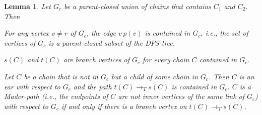 \documentclass[paper=a4]{scrartcl}
\newtheorem{lemma}{Lemma}
\newcommand{\edge}[2]{\ensuremath{#1\,#2}}
\begin{document}
\begin{lemma}\label{parent-closed union of chains}
Let $G_c$ be a parent-closed union of chains that contains $C_1$ and
$C_2$. Then
\begin{compactenum}[(1)]
\item For any vertex $v \not= r$ of $G_c$, the edge $\edge{v}{p(v)}$ is contained in $G_c$, i.e., the set of vertices of $G_c$ is a parent-closed subset of the DFS-tree.
\item $s(C)$ and $t(C)$ are branch vertices of $G_c$ for every chain $C$ contained in $G_c$.
\item Let $C$ be a chain that is not in $G_c$ but a child of some chain in $G_c$. Then $C$ is an ear with respect to $G_c$ and the path $t(C)\rightarrow_T s(C)$ is contained in $G_c$. $C$ is a Mader-path (i.e., the endpoints of $C$ are not inner vertices of the same link of $G_c$) with respect to $G_c$ if and only if there is a branch vertex on $t(C)\rightarrow_T s(C)$.
\end{compactenum}
\end{lemma}
\end{document}
